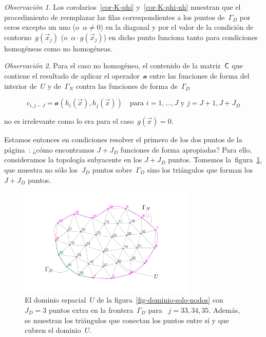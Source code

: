 \documentclass[
  12pt,
  a4paper,
  table]{scrbook}
\theoremstyle{plain}
\theoremstyle{definition}
\theoremstyle{plain}
\theoremstyle{plain}
\theoremstyle{remark}
\newtheorem*{remark}{Observación}
\begin{document}
\begin{remark}

Los corolarios~\ref{cor-K-phi} y~\ref{cor-K-phi-nh} muestran que el
procedimiento de reemplazar las filas correspondientes a los puntos
de~\(\Gamma_D\) por ceros excepto un uno (o~\(\alpha \neq 0\)) en la
diagonal y por el valor de la condición de contorno~\(g(\vec{x}_j)\)
(o~\(\alpha \cdot g(\vec{x}_j)\)) en dicho punto funciona tanto para
condiciones homogéneas como no homogéneas.

\end{remark}

\begin{remark}

Para el caso no homogéneo, el contenido de la matriz~\(\mathsf{C}\) que
contiene el resultado de aplicar el operador~\(\mathcal{a}\) entre las
funciones de forma del interior de~\(U\) y de~\(\Gamma_N\) contra las
funciones de forma de~\(\Gamma_D\)

\[
c_{i,j-J} = \mathcal{a}\left(h_i(\vec{x}),h_j(\vec{x})\right) \quad \text{para $i=1,\dots,J$ y $j=J+1,J+J_D$}
\]

no es irrelevante como lo era para el caso~\(g(\vec{x})=0\).

\end{remark}

Estamos entonces en condiciones resolver el primero de los dos puntos
de la página~\pageref{dos}: ¿cómo encontramos \(J+J_D\) funciones de
forma apropiadas? Para ello, consideramos la topología subyacente en los
\(J+J_D\) puntos. Tomemos la~figura~\ref{fig-dominio-nodos-elementos},
que muestra no sólo los~\(J_D\) puntos sobre~\(\Gamma_D\) sino los
triángulos que forman los~\(J+J_D\) puntos.

\begin{figure}

{\centering \includegraphics[width=0.75\textwidth,height=\textheight]{040-discretizacion/dominio-nodos-elementos.pdf}

}

\caption{\label{fig-dominio-nodos-elementos}El dominio espacial~\(U\) de
la figura~\ref{fig-dominio-solo-nodos} con \(J_D=3\) puntos extra en la
frontera~\(\Gamma_D\) para~ \(j=33,34,35\). Además, se muestran los
triángulos que conectan los puntos entre sí y que cubren el
dominio~\(U\).}

\end{figure}
\end{document}
